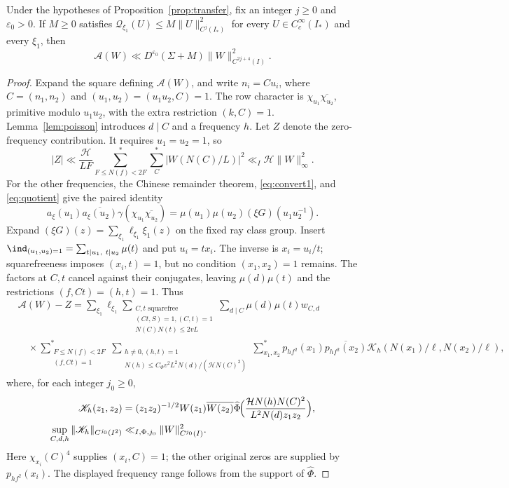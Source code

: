 \begin{lemma}\label{lem:first-transfer}
Under the hypotheses of Proposition~\ref{prop:transfer}, fix an integer
$j\ge0$ and $\varepsilon_0>0$. If $M\ge0$ satisfies
$\mathcal Q_{\xi_1}(U)\le M\|U\|_{C^j(I_*)}^2$
for every $U\in C_c^\infty(I_*)$ and every $\xi_1$, then
\[
 \mathcal A(W)\ll D^{\varepsilon_0}(\Sigma+M)
                    \|W\|_{C^{2j+4}(I)}^2.
\]
\end{lemma}
\begin{proof}
Expand the square defining $\mathcal A(W)$, and write
$n_i=Cu_i$, where $C=(n_1,n_2)$ and
$(u_1,u_2)=(u_1u_2,C)=1$. The row character is
$\chi_{u_1}\overline{\chi_{u_2}}$, primitive modulo $u_1u_2$,
with the extra restriction $(k,C)=1$.
Lemma~\ref{lem:poisson} introduces $d\mid C$ and a frequency $h$.
Let $Z$ denote the zero-frequency contribution. It requires $u_1=u_2=1$, so
\[
 |Z|\ll\frac{\mathcal H}{LF}
       \sum_{F\le N(f)<2F}^*\sum_C^*|W(N(C)/L)|^2
 \ll_I\mathcal H\|W\|_\infty^2.
\]
For the other frequencies, the Chinese remainder theorem,
\eqref{eq:convert1}, and \eqref{eq:quotient} give the paired identity
\begin{equation}\label{eq:paired-first-gauss}
 a_\xi(u_1)\overline{a_\xi(u_2)}
 \gamma(\chi_{u_1}\overline{\chi_{u_2}})
 =\mu(u_1)\mu(u_2)(\xi G)(u_1u_2^{-1}).
\end{equation}
Expand $(\xi G)(z)=\sum_{\xi_1}\ell_{\xi_1}\xi_1(z)$ on the
fixed ray class group. Insert
$\ind_{(u_1,u_2)=1}=\sum_{t\mid u_1,\ t\mid u_2}\mu(t)$ and put
$u_i=tx_i$. The inverse is $x_i=u_i/t$; squarefreeness imposes
$(x_i,t)=1$, but no condition $(x_1,x_2)=1$ remains.
The factors at $C,t$ cancel against their conjugates, leaving
$\mu(d)\mu(t)$ and the restrictions $(f,Ct)=(h,t)=1$.
Thus
\[
 \begin{aligned}
 &\mathcal A(W)-Z
 =\sum_{\xi_1}\ell_{\xi_1}
 \sum_{\substack{C,t\text{ squarefree}\\(Ct,S)=1, (C,t)=1\\
                  N(C)N(t)\le2vL}}
 \sum_{d\mid C}\mu(d)\mu(t)w_{C,d}\\
 &\quad\times\sum_{\substack{F\le N(f)<2F\\(f,Ct)=1}}^*
 \sum_{\substack{h\ne0, (h,t)=1\\
         N(h)\le C_\Phi v^2L^2N(d)/(\mathcal H N(C)^2)}} \sum_{x_1,x_2}^*
 p_{hf^2}(x_1)\overline{p_{hf^2}(x_2)}
 \mathscr K_h(N(x_1)/\ell,N(x_2)/\ell),
 \end{aligned}
\]
where, for each integer $j_0\ge0$,
\[
 \begin{aligned}
 \mathscr K_h(z_1,z_2)
 &=(z_1z_2)^{-1/2}W(z_1)\overline{W(z_2)}
 \widehat\Phi\!\Bigl(
  \frac{\mathcal H N(h)N(C)^2}{L^2N(d)z_1z_2}\Bigr),\\
 \sup_{C,d,h}\|\mathscr K_h\|_{C^{j_0}(I^2)}
 &\ll_{I,\Phi,j_0}\|W\|_{C^{j_0}(I)}^2.
 \end{aligned}
\]
Here $\chi_{x_i}(C)^4$ supplies $(x_i,C)=1$; the other original
zeros are supplied by $p_{hf^2}(x_i)$. The displayed frequency
range follows from the support of $\widehat\Phi$.


\end{proof}
